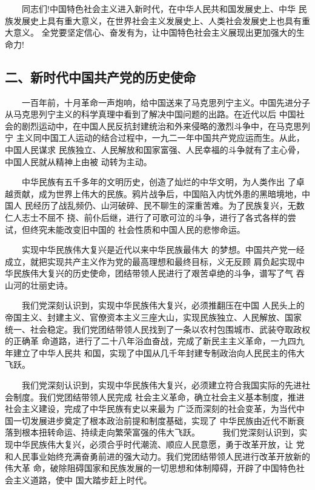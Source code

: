 \documentclass[11pt]{ctexart}
\begin{document}
{{{{　　同志们!中国特色社会主义进入新时代，在中华人民共和国发展史上、中华
民族发展史上具有重大意义，在世界社会主义发展史上、人类社会发展史上也具有重大意义。
全党要坚定信心、奋发有为，让中国特色社会主义展现出更加强大的生命力!

\subsection{二、新时代中国共产党的历史使命}
\label{sec:orgd32b6dc}

　　一百年前，十月革命一声炮响，给中国送来了马克思列宁主义。中国先进分子从马克思列宁主义的科学真理中看到了解决中国问题的出路。在近代以后
中国社会的剧烈运动中，在中国人民反抗封建统治和外来侵略的激烈斗争中，在马克思列宁
主义同中国工人运动的结合过程中，一九二一年中国共产党应运而生。从此，中国人民谋求
民族独立、人民解放和国家富强、人民幸福的斗争就有了主心骨，中国人民就从精神上由被
动转为主动。

　　中华民族有五千多年的文明历史，创造了灿烂的中华文明，为人类作出
了卓越贡献，成为世界上伟大的民族。鸦片战争后，中国陷入内忧外患的黑暗境地，中国人
民经历了战乱频仍、山河破碎、民不聊生的深重苦难。为了民族复兴，无数仁人志士不屈不
挠、前仆后继，进行了可歌可泣的斗争，进行了各式各样的尝试，但终究未能改变旧中国的
社会性质和中国人民的悲惨命运。

　　实现中华民族伟大复兴是近代以来中华民族最伟大
的梦想。中国共产党一经成立，就把实现共产主义作为党的最高理想和最终目标，义无反顾
肩负起实现中华民族伟大复兴的历史使命，团结带领人民进行了艰苦卓绝的斗争，谱写了气
吞山河的壮丽史诗。

　　我们党深刻认识到，实现中华民族伟大复兴，必须推翻压在中国
人民头上的帝国主义、封建主义、官僚资本主义三座大山，实现民族独立、人民解放、国家
统一、社会稳定。我们党团结带领人民找到了一条以农村包围城市、武装夺取政权的正确革
命道路，进行了二十八年浴血奋战，完成了新民主主义革命，一九四九年建立了中华人民共
和国，实现了中国从几千年封建专制政治向人民民主的伟大飞跃。

　　我们党深刻认识到，实现中华民族伟大复兴，必须建立符合我国实际的先进社会制度。我们党团结带领人民完成
社会主义革命，确立社会主义基本制度，推进社会主义建设，完成了中华民族有史以来最为
广泛而深刻的社会变革，为当代中国一切发展进步奠定了根本政治前提和制度基础，实现了
中华民族由近代不断衰落到根本扭转命运、持续走向繁荣富强的伟大飞跃。
　
　我们党深刻认识到，实现中华民族伟大复兴，必须合乎时代潮流、顺应人民意愿，勇于改革开放，让
党和人民事业始终充满奋勇前进的强大动力。我们党团结带领人民进行改革开放新的伟大革
命，破除阻碍国家和民族发展的一切思想和体制障碍，开辟了中国特色社会主义道路，使中
国大踏步赶上时代。

}}}}
\end{document}
